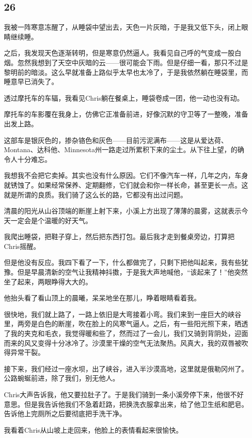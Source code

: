 \documentclass[UTF8]{article}
\begin{document}
\subsection*{26}
\par 我被一阵寒意冻醒了，从睡袋中望出去，天色一片灰暗，于是我又低下头，闭上眼睛继续睡。
\par 之后，我发现天色逐渐转明，但是寒意仍然逼人。我看见自己呼的气变成一股白烟。忽然我想到了天空中灰暗的云——很可能会下雨。但是仔细一看，那只不过是黎明前的暗淡。这么早就准备上路似乎太早也太冷了，于是我依然躺在睡袋里，而睡意早已消失了。
\par 透过摩托车的车辐，我看见Chris躺在餐桌上，睡袋卷成一团，他一动也没有动。
\par 摩托车的车影覆在我身上，仿佛它正准备前进，好像沉默的守卫等了一整晚，准备出发上路。
\par 这部车是银灰色的，掺杂铬色和灰色——目前污泥满布——这是从爱达荷、Montana、达科他、Minnesota州一路走过所累积下来的尘土。从下往上望，的确令人十分难忘。
\par 我想我不会把它卖掉。其实也没有什么原因。它们不像汽车一样，几年之内，车身就锈蚀了。如果经常保养、定期翻修，它们就会和你一样长命，甚至更长一点。这就是所谓的良质。我们骑了这么长的路，它都没有出过问题。
\par 清晨的阳光从山谷顶端的断崖上射下来，小溪上方出现了薄薄的晨雾，这就表示今天一定会是个温暖的好天气。
\par 我爬出睡袋，把鞋子穿上，然后把东西打包。最后我才走到餐桌旁边，打算把Chris摇醒。
\par 但是他没有反应。我四下看了一下，什么都做完了，只剩下把他叫起来，我有些犹豫。但是早晨清新的空气让我精神抖擞，于是我大声地喊他，“该起来了！”他突然坐了起来，两眼睁得大大的。
\par 他抬头看了看山顶上的晨曦，呆呆地坐在那儿，睁着眼睛看着我。
\par 很快地，我们就上路了，一路上依旧是大弯接着小弯。我们来到一座巨大的峡谷里，两旁是白色的断崖，吹在脸上的风寒气逼人。之后，有一些阳光照下来，晒透了我的夹克和毛衣，我觉得暖和些了，然而过了一会儿，我们又骑到背阴处，迎面而来的风又变得十分冰冷了。沙漠里干燥的空气无法聚热。风真大，我的双唇被吹得异常干裂。
\par 接下来，我们经过一座水坝，出了峡谷，进入半沙漠高地，这里就是俄勒冈州了。公路蜿蜒前进，除了我们，别无他人。
\par Chris大声告诉我，他又要拉肚子了。于是我们骑到一条小溪旁停下来，他很不好意思。但是我告诉他我们不急着赶路，把换洗衣服拿出来，给了他卫生纸和肥皂。告诉他上完厕所之后要彻底把手洗干净。
\par 我看着Chris从山坡上走回来，他脸上的表情看起来很愉快。
\end{document}
